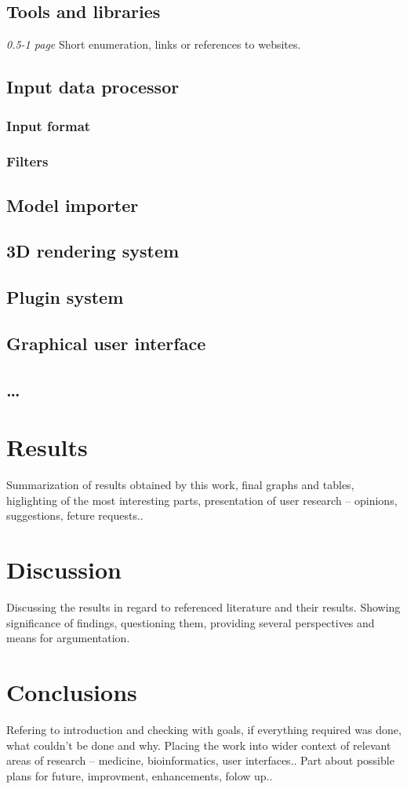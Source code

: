 \section{Tools and libraries}
\emph{0.5-1 page}
Short enumeration, links or references to websites.
\section{Input data processor}
\subsection{Input format}
\subsection{Filters}
\section{Model importer}
\section{3D rendering system}
\section{Plugin system}
\section{Graphical user interface}
\section{\ldots}
\chapter{Results}
Summarization of results obtained by this work, final graphs and tables,
higlighting of the most interesting parts, presentation of user 
research -- opinions, suggestions,
feture requests..
\chapter{Discussion}
Discussing the results in regard to referenced literature and their results.
Showing significance of findings, questioning them, providing several
perspectives and means for argumentation.
\chapter{Conclusions}
Refering to introduction and checking with goals, if everything required was
done, what couldn't be done and why. Placing the work into wider context of
relevant areas of research -- medicine, bioinformatics, user interfaces..
Part about possible plans for future, improvment, enhancements, folow up.. \cite{Knuth}
